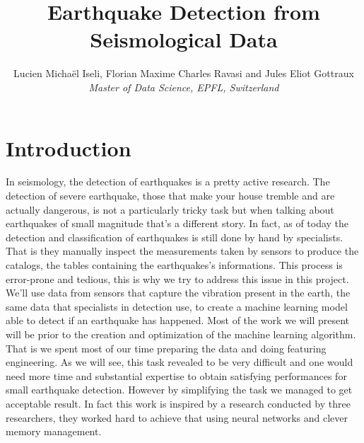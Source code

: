 \documentclass[10pt,conference,compsocconf]{IEEEtran}
\begin{document}
\title{Earthquake Detection from Seismological Data}

\author{
  Lucien Michaël Iseli, Florian Maxime Charles Ravasi and Jules Eliot Gottraux\\
  \textit{Master of Data Science, EPFL, Switzerland}
}

\maketitle
\section{Introduction}
In seismology, the detection of earthquakes is a pretty active research. The detection of severe earthquake, those that make your house tremble and are actually dangerous, is not a particularly tricky task but when talking about earthquakes of small magnitude that's a different story. In fact, as of today the detection and classification of earthquakes is still done by hand by specialists. That is they manually inspect the measurements taken by sensors to produce the catalogs, the tables containing the earthquakes's informations. This process is error-prone and tedious, this is why we try to address this issue in this project. We'll use data from sensors that capture the vibration present in the earth, the same data that specialists in detection use, to create a machine learning model able to detect if an earthquake has happened. Most of the work we will present will be prior to the creation and optimization of the machine learning algorithm. That is we spent most of our time preparing the data and doing featuring engineering. As we will see, this task revealed to be very difficult and one would need more time and substantial expertise to obtain satisfying performances for small earthquake detection. However by simplifying the task we managed to get acceptable result. In fact this work is inspired by a research \cite{ConvNetPaper} conducted by three researchers, they worked hard to achieve that using neural networks and clever memory management.
\end{document}

